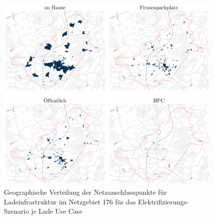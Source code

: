 \begin{figure}[H]
    \centering
    \includegraphics[width=\textwidth]{Bilder/cps_in_grid_176}
    \caption{Geographische Verteilung der Netzanschlusspunkte für Ladeinfrastruktur im Netzgebiet \num{176} für das Elektrifizierungs-Szenario je Lade Use Case}\label{fig:cps_in_grid}
\end{figure}